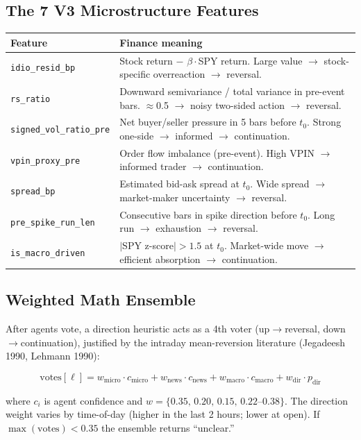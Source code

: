 \documentclass[11pt, a4paper]{article}
\begin{document}
\subsection{The 7 V3 Microstructure Features}

\begin{center}
\renewcommand{\arraystretch}{1.2}
\begin{tabular}{lp{8.5cm}}
\toprule
\textbf{Feature} & \textbf{Finance meaning} \\
\midrule
\texttt{idio\_resid\_bp} & Stock return $-$ $\beta\cdot$SPY return. Large value $\to$ stock-specific overreaction $\to$ reversal. \\
\texttt{rs\_ratio}       & Downward semivariance / total variance in pre-event bars. $\approx$0.5 $\to$ noisy two-sided action $\to$ reversal. \\
\texttt{signed\_vol\_ratio\_pre} & Net buyer/seller pressure in 5 bars before $t_0$. Strong one-side $\to$ informed $\to$ continuation. \\
\texttt{vpin\_proxy\_pre} & Order flow imbalance (pre-event). High VPIN $\to$ informed trader $\to$ continuation. \\
\texttt{spread\_bp}      & Estimated bid-ask spread at $t_0$. Wide spread $\to$ market-maker uncertainty $\to$ reversal. \\
\texttt{pre\_spike\_run\_len} & Consecutive bars in spike direction before $t_0$. Long run $\to$ exhaustion $\to$ reversal. \\
\texttt{is\_macro\_driven} & $|$SPY z-score$|>1.5$ at $t_0$. Market-wide move $\to$ efficient absorption $\to$ continuation. \\
\bottomrule
\end{tabular}
\end{center}

\subsection{Weighted Math Ensemble}

After agents vote, a direction heuristic acts as a 4th voter (up$\to$reversal, down$\to$continuation), justified by the intraday mean-reversion literature (Jegadeesh 1990, Lehmann 1990):

\[
\text{votes}[\ell] = w_\text{micro}\cdot c_\text{micro} + w_\text{news}\cdot c_\text{news} + w_\text{macro}\cdot c_\text{macro} + w_\text{dir}\cdot p_\text{dir}
\]

where $c_i$ is agent confidence and $w = \{0.35,\, 0.20,\, 0.15,\, 0.22\text{--}0.38\}$. The direction weight varies by time-of-day (higher in the last 2 hours; lower at open). If $\max(\text{votes}) < 0.35$ the ensemble returns ``unclear.''
\end{document}
